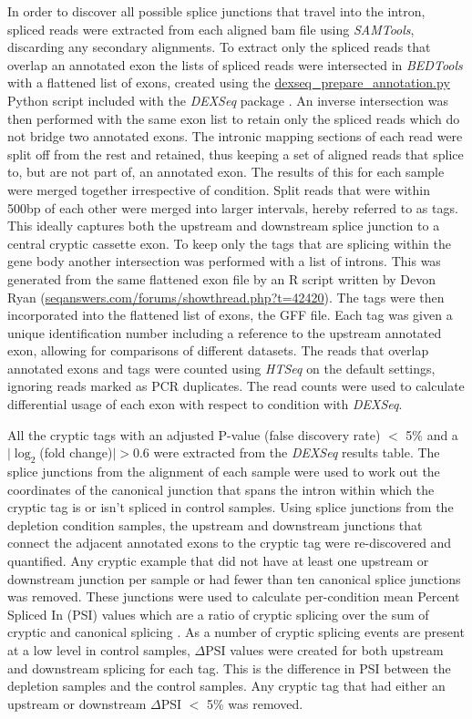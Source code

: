 In order to discover all possible splice junctions that travel into the intron, spliced reads were extracted from each aligned bam file using \emph{SAMTools}, discarding any secondary alignments. To extract only the spliced reads that overlap an annotated exon the lists of spliced reads were intersected in \emph{BEDTools} with a flattened list of exons, created using the \url{dexseq\_prepare\_annotation.py} Python script included with the \emph{DEXSeq} package \citep{Anders2012}. An inverse intersection was then performed with the same exon list to retain only the spliced reads which do not bridge two annotated exons. The intronic mapping sections of each read were split off from the rest and retained, thus keeping a set of aligned reads that splice to, but are not part of, an annotated exon. The results of this for each sample were merged together irrespective of condition. Split reads that were within 500bp of each other were merged into larger intervals, hereby referred to as tags. This ideally captures both the upstream and downstream splice junction to a central cryptic cassette exon.  To keep only the tags that are splicing within the gene body another intersection was performed with a list of introns. This was generated from the same flattened exon file by an R script written by Devon Ryan (\url{seqanswers.com/forums/showthread.php?t=42420}). The tags were then incorporated into the flattened list of exons, the GFF file. Each tag was given a unique identification number including a reference to the upstream annotated exon, allowing for comparisons of different datasets. The reads that overlap annotated exons and tags were counted using \textit{HTSeq} \citep{Anders2015-wz} on the default settings, ignoring reads marked as PCR duplicates. The read counts were used to calculate differential usage of each exon with respect to condition with \textit{DEXSeq}. 

All the cryptic tags with an adjusted P-value (false discovery rate) $<$ 5\% and a $|\log_{2}$(fold change)$| > 0.6$ were extracted from the \textit{DEXSeq} results table. The splice junctions from the alignment of each sample were used to work out the coordinates of the canonical junction that spans the intron within which the cryptic tag is or isn't spliced in control samples. Using splice junctions from the depletion condition samples, the upstream and downstream junctions that connect the adjacent annotated exons to the cryptic tag were re-discovered and quantified. Any cryptic example that did not have at least one upstream or downstream junction per sample or had fewer than ten canonical splice junctions was removed. These junctions were used to calculate per-condition mean Percent Spliced In (PSI) values which are a ratio of cryptic splicing over the sum of cryptic and canonical splicing \citep{Katz2010-ir}. As a number of cryptic splicing events are present at a low level in control samples, $\Delta$PSI values were created for both upstream and downstream splicing for each tag. This is the difference in PSI between the depletion samples and the control samples. Any cryptic tag that had either an upstream or downstream $\Delta$PSI $<$ 5\% was removed.




